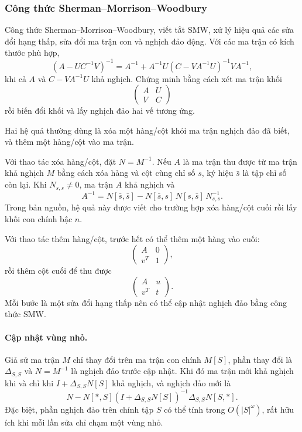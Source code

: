 \documentclass[11pt]{article}
\begin{document}
\subsubsection{Công thức Sherman--Morrison--Woodbury}

Công thức Sherman--Morrison--Woodbury, viết tắt SMW, xử lý hiệu quả các sửa đổi
hạng thấp, sửa đổi ma trận con và nghịch đảo động. Với các ma trận có kích thước
phù hợp,
\[
  (A-UC^{-1}V)^{-1}
  = A^{-1}+A^{-1}U(C-VA^{-1}U)^{-1}VA^{-1},
\]
khi cả $A$ và $C-VA^{-1}U$ khả nghịch. Chứng minh bằng cách xét ma trận khối
\[
  \begin{pmatrix} A&U\\ V&C \end{pmatrix}
\]
rồi biến đổi khối và lấy nghịch đảo hai vế tương ứng.

Hai hệ quả thường dùng là xóa một hàng/cột khỏi ma trận nghịch đảo đã biết, và
thêm một hàng/cột vào ma trận.

Với thao tác xóa hàng/cột, đặt \(N=M^{-1}\). Nếu \(A\) là ma trận thu được từ
ma trận khả nghịch \(M\) bằng cách xóa hàng và cột cùng chỉ số \(s\), ký hiệu
\(\bar s\) là tập chỉ số còn lại. Khi \(N_{s,s}\ne0\), ma trận \(A\) khả nghịch
và
\[
  A^{-1}=N[\bar s,\bar s]-N[\bar s,s]\,N[s,\bar s]\,N_{s,s}^{-1}.
\]
Trong bản nguồn, hệ quả này được viết cho trường hợp xóa hàng/cột cuối rồi lấy
khối con chính bậc \(n\).

Với thao tác thêm hàng/cột, trước hết có thể thêm một hàng vào cuối:
\[
  \begin{pmatrix}
  A&0\\
  v^T&1
  \end{pmatrix},
\]
rồi thêm cột cuối để thu được
\[
  \begin{pmatrix}
  A&u\\
  v^T&t
  \end{pmatrix}.
\]
Mỗi bước là một sửa đổi hạng thấp nên có thể cập nhật nghịch đảo bằng công thức
SMW.

\paragraph{Cập nhật vùng nhỏ.}
Giả sử ma trận $M$ chỉ thay đổi trên ma trận con chính $M[S]$, phần thay đổi là
$\Delta_{S,S}$ và $N=M^{-1}$ là nghịch đảo trước cập nhật. Khi đó ma trận mới khả
nghịch khi và chỉ khi $I+\Delta_{S,S}N[S]$ khả nghịch, và nghịch đảo mới là
\[
  N-N[*,S](I+\Delta_{S,S}N[S])^{-1}\Delta_{S,S}N[S,*].
\]
Đặc biệt, phần nghịch đảo trên chính tập $S$ có thể tính trong
$O(|S|^\omega)$, rất hữu ích khi mỗi lần sửa chỉ chạm một vùng nhỏ.
\end{document}
